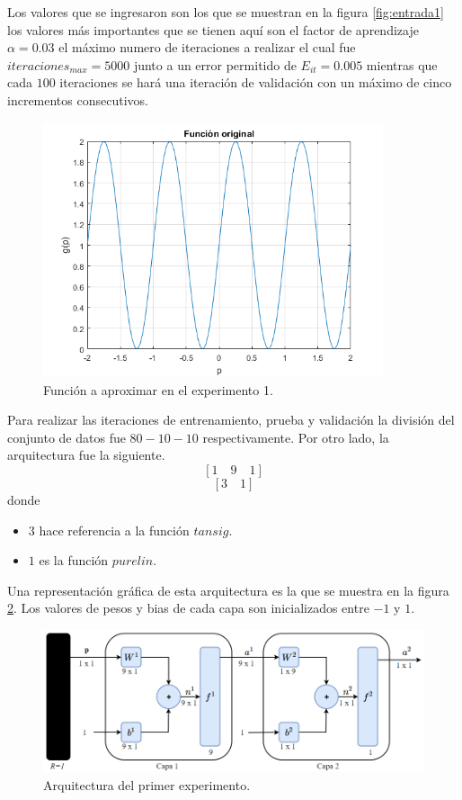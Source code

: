 Los valores que se ingresaron son los que se muestran en la figura \ref{fig:entrada1} los valores más importantes que se tienen aquí son el factor de aprendizaje $\alpha=0.03$ el máximo numero de iteraciones a realizar el cual fue $iteraciones_{max} = 5000$ junto a un error permitido de $E_{it} = 0.005$ mientras que cada $100$ iteraciones se hará una iteración de validación con un máximo de cinco incrementos consecutivos.
\begin{figure}[H]
    \begin{center}
        \includegraphics[width=10cm]{1/original.png}
        \caption{Función a aproximar en el experimento 1.}
        \label{fig:original1}
    \end{center}
\end{figure}
Para realizar las iteraciones de entrenamiento, prueba y validación la división del conjunto de datos fue $80-10-10$ respectivamente. Por otro lado, la arquitectura fue la siguiente.
\[ \left[ 1 \quad 9 \quad 1 \right] \]
\[ \left[ 3 \quad 1 \right] \]
donde
\begin{itemize}
    \item $3$ hace referencia a la función $tansig$.
    \item $1$ es la función $purelin$.
\end{itemize}
Una representación gráfica de esta arquitectura es la que se muestra en la figura \ref{fig:arqui1}. Los valores de pesos y bias de cada capa son inicializados entre $-1$ y $1$.
\begin{figure}[H]
    \begin{center}
        \includegraphics[width=16cm]{img/arqui1.png}
        \caption{Arquitectura del primer experimento.}
        \label{fig:arqui1}
    \end{center}
\end{figure}
